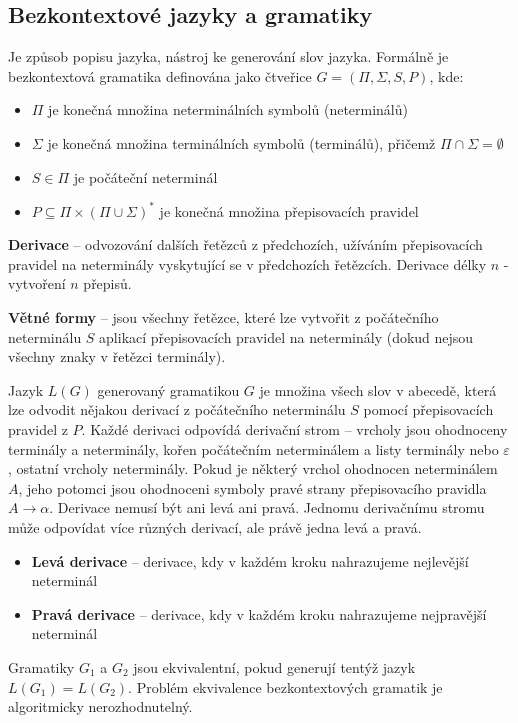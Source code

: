\subsection{Bezkontextové jazyky a gramatiky}
Je způsob popisu jazyka, nástroj ke generování slov jazyka. Formálně je bezkontextová gramatika definována jako čtveřice $G = (\Pi, \Sigma, S, P)$, kde:
\begin{itemize}
\item $\Pi$ je konečná množina neterminálních symbolů (neterminálů)
\item $\Sigma$ je konečná množina terminálních symbolů (terminálů), přičemž $\Pi \cap \Sigma = \emptyset$
\item $S \in \Pi$ je počáteční neterminál
\item $P \subseteq \Pi \times (\Pi \cup \Sigma)^*$ je konečná množina přepisovacích pravidel
\end{itemize}

\textbf{Derivace} -- odvozování dalších řetězců z předchozích, užíváním přepisovacích pravidel na neterminály vyskytující se v předchozích řetězcích. Derivace délky $n$ - vytvoření $n$ přepisů.

\textbf{Větné formy} -- jsou všechny řetězce, které lze vytvořit z počátečního neterminálu $S$ aplikací přepisovacích pravidel na neterminály (dokud nejsou všechny znaky v řetězci terminály).


Jazyk $L(G)$ generovaný gramatikou $G$ je množina všech slov v abecedě, která lze odvodit nějakou derivací z počátečního neterminálu $S$ pomocí přepisovacích pravidel z $P$. Každé derivaci odpovídá derivační strom -- vrcholy jsou ohodnoceny terminály a neterminály, kořen počátečním neterminálem a listy terminály nebo $\varepsilon$, ostatní vrcholy neterminály. Pokud je některý vrchol ohodnocen neterminálem $A$, jeho potomci jsou ohodnoceni symboly pravé strany přepisovacího pravidla $A \rightarrow \alpha$. Derivace nemusí být ani levá ani pravá. Jednomu derivačnímu stromu může odpovídat více různých derivací, ale právě jedna levá a pravá.
\begin{itemize}
\item \textbf{Levá derivace} -- derivace, kdy v každém kroku nahrazujeme nejlevější neterminál
\item \textbf{Pravá derivace} -- derivace, kdy v každém kroku nahrazujeme nejpravější neterminál
\end{itemize}

Gramatiky $G_1$ a $G_2$ jsou ekvivalentní, pokud generují tentýž jazyk $L(G_1) = L(G_2)$. Problém ekvivalence bezkontextových gramatik je algoritmicky nerozhodnutelný.

